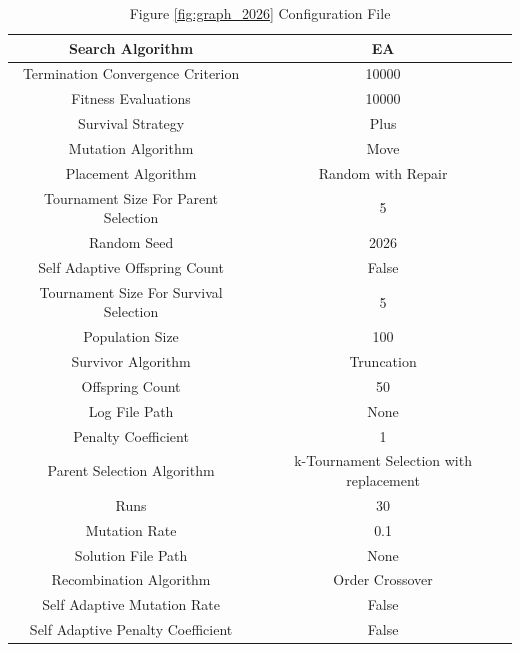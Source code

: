 \documentclass{standalone}
\begin{document}
\begin{table}[!htb]
	\centering
	\caption{Figure \ref{fig:graph_2026} Configuration File}
	\label{tab:graph_2026}
	\begin{tabular}{| c | c |}
		\hline
		Search Algorithm		& EA		 \\
		\hline
		Termination Convergence Criterion		& 10000		 \\
		\hline
		Fitness Evaluations		& 10000		 \\
		\hline
		Survival Strategy		& Plus		 \\
		\hline
		Mutation Algorithm		& Move		 \\
		\hline
		Placement Algorithm		& Random with Repair		 \\
		\hline
		Tournament Size For Parent Selection		& 5		 \\
		\hline
		Random Seed		& 2026		 \\
		\hline
		Self Adaptive Offspring Count		& False		 \\
		\hline
		Tournament Size For Survival Selection		& 5		 \\
		\hline
		Population Size		& 100		 \\
		\hline
		Survivor Algorithm		& Truncation		 \\
		\hline
		Offspring Count		& 50		 \\
		\hline
		Log File Path		& None		 \\
		\hline
		Penalty Coefficient		& 1		 \\
		\hline
		Parent Selection Algorithm		& k-Tournament Selection with replacement		 \\
		\hline
		Runs		& 30		 \\
		\hline
		Mutation Rate		& 0.1		 \\
		\hline
		Solution File Path		& None		 \\
		\hline
		Recombination Algorithm		& Order Crossover		 \\
		\hline
		Self Adaptive Mutation Rate		& False		 \\
		\hline
		Self Adaptive Penalty Coefficient		& False		 \\
		\hline
	\end{tabular}
\end{table}
\end{document}
